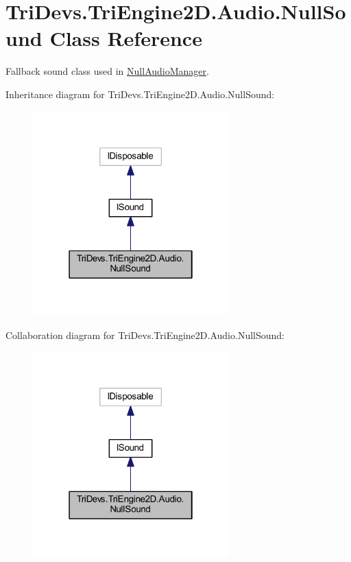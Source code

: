 \hypertarget{class_tri_devs_1_1_tri_engine2_d_1_1_audio_1_1_null_sound}{\section{Tri\-Devs.\-Tri\-Engine2\-D.\-Audio.\-Null\-Sound Class Reference}
\label{class_tri_devs_1_1_tri_engine2_d_1_1_audio_1_1_null_sound}
}


Fallback sound class used in \hyperlink{class_tri_devs_1_1_tri_engine2_d_1_1_audio_1_1_null_audio_manager}{Null\-Audio\-Manager}.  




Inheritance diagram for Tri\-Devs.\-Tri\-Engine2\-D.\-Audio.\-Null\-Sound\-:
\nopagebreak
\begin{figure}[H]
\begin{center}
\leavevmode
\includegraphics[width=214pt]{class_tri_devs_1_1_tri_engine2_d_1_1_audio_1_1_null_sound__inherit__graph}
\end{center}
\end{figure}


Collaboration diagram for Tri\-Devs.\-Tri\-Engine2\-D.\-Audio.\-Null\-Sound\-:
\nopagebreak
\begin{figure}[H]
\begin{center}
\leavevmode
\includegraphics[width=214pt]{class_tri_devs_1_1_tri_engine2_d_1_1_audio_1_1_null_sound__coll__graph}
\end{center}
\end{figure}
